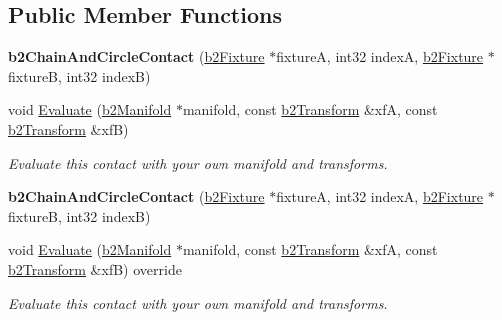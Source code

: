 \subsection*{Public Member Functions}
\begin{DoxyCompactItemize}
\item 
\mbox{\label{classb2ChainAndCircleContact_a7303997b9af2b859346b4fc4d7e107d5}} 
{\bfseries b2\+Chain\+And\+Circle\+Contact} (\hyperlink{classb2Fixture}{b2\+Fixture} $\ast$fixtureA, int32 indexA, \hyperlink{classb2Fixture}{b2\+Fixture} $\ast$fixtureB, int32 indexB)
\item 
\mbox{\label{classb2ChainAndCircleContact_afe52ebd870f24cbecedd1db662705f12}} 
void \hyperlink{classb2ChainAndCircleContact_afe52ebd870f24cbecedd1db662705f12}{Evaluate} (\hyperlink{structb2Manifold}{b2\+Manifold} $\ast$manifold, const \hyperlink{structb2Transform}{b2\+Transform} \&xfA, const \hyperlink{structb2Transform}{b2\+Transform} \&xfB)
\begin{DoxyCompactList}\small\item\em Evaluate this contact with your own manifold and transforms. \end{DoxyCompactList}\item 
\mbox{\label{classb2ChainAndCircleContact_a7303997b9af2b859346b4fc4d7e107d5}} 
{\bfseries b2\+Chain\+And\+Circle\+Contact} (\hyperlink{classb2Fixture}{b2\+Fixture} $\ast$fixtureA, int32 indexA, \hyperlink{classb2Fixture}{b2\+Fixture} $\ast$fixtureB, int32 indexB)
\item 
\mbox{\label{classb2ChainAndCircleContact_abdc7f895b76f99f7ddc444ed11986c89}} 
void \hyperlink{classb2ChainAndCircleContact_abdc7f895b76f99f7ddc444ed11986c89}{Evaluate} (\hyperlink{structb2Manifold}{b2\+Manifold} $\ast$manifold, const \hyperlink{structb2Transform}{b2\+Transform} \&xfA, const \hyperlink{structb2Transform}{b2\+Transform} \&xfB) override
\begin{DoxyCompactList}\small\item\em Evaluate this contact with your own manifold and transforms. \end{DoxyCompactList}\end{DoxyCompactItemize}
